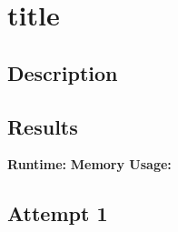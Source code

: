 \chapter{title}
\section{Description}
\section{Results}
\textbf{Runtime:}
\textbf{Memory Usage:}
\newpage
\section{Attempt 1}
\begin{lstlisting}

\end{lstlisting}
